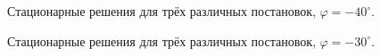 \documentclass[14pt, a4paper, fleqn]{extarticle}
\begin{document}
\begin{figure}[H]
\caption{Стационарные решения для трёх различных постановок, $\varphi = -40^\circ$.}
\end{figure}

\begin{figure}[H]
\caption{Стационарные решения для трёх различных постановок, $\varphi = -30^\circ$.}
\end{figure}
\end{document}

